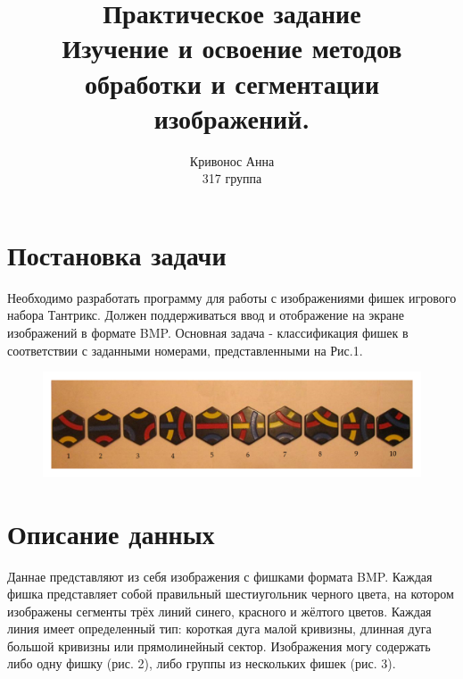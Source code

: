 \documentclass[a4paper, 12pt]{article}
\author{Кривонос Анна \\ 317 группа}
\title{Практическое задание \\ 
Изучение и освоение методов обработки и сегментации изображений. }
\begin{document}
\maketitle
\clearpage
\tableofcontents{}
\clearpage


\section{Постановка задачи}
Необходимо разработать программу для работы с изображениями фишек игрового набора Тантрикс. Должен поддерживаться ввод и отображение на экране изображений в формате BMP. Основная задача - классификация фишек в соответствии с заданными номерами, представленными на Рис.1.  

\begin{figure}[H]
        	\centering
        	\includegraphics[width=1\linewidth]{Dozen_0.pdf}
        	\label{fig:mpr_-1}
        	\vspace{-25pt}
        	\caption{}
\end{figure}


\section{Описание данных}
Даннае представляют из себя изображения с фишками формата BMP. 
Каждая фишка представляет собой правильный шестиугольник черного цвета, на котором изображены сегменты трёх линий синего, красного и жёлтого цветов. Каждая линия имеет определенный тип: короткая дуга малой кривизны, длинная дуга большой кривизны или прямолинейный сектор.
Изображения  могу содержать либо одну фишку (рис. 2), либо группы из нескольких фишек (рис. 3).
\end{document}
